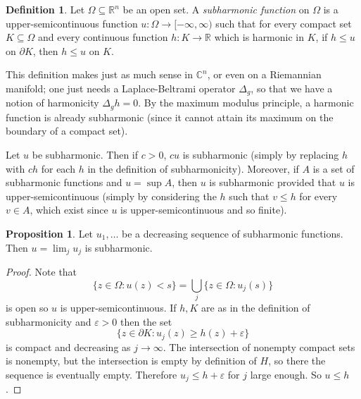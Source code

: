\documentclass[12pt]{report}
\newcommand{\RR}{\mathbb{R}}
\newcommand{\CC}{\mathbb{C}}
\newcommand{\dfn}[1]{\emph{#1}\index{#1}}
\theoremstyle{definition}
\newtheorem{proposition}[theorem]{Proposition}
\newtheorem{definition}[theorem]{Definition}
\begin{document}
\begin{definition}
    Let $\Omega \subseteq \RR^n$ be an open set. A \dfn{subharmonic function} on $\Omega$ is a upper-semicontinuous function $u: \Omega \to [-\infty, \infty)$ such that for every compact set $K \subseteq \Omega$ and every continuous function $h: K \to \RR$ which is harmonic in $K$, if $h \leq u$ on $\partial K$, then $h \leq u$ on $K$.
\end{definition}
This definition makes just as much sense in $\CC^n$, or even on a Riemannian manifold; one just needs a Laplace-Beltrami operator $\Delta_g$, so that we have a notion of harmonicity $\Delta_g h = 0$. By the maximum modulus principle, a harmonic function is already subharmonic (since it cannot attain its maximum on the boundary of a compact set).

Let $u$ be subharmonic. Then if $c > 0$, $cu$ is subharmonic (simply by replacing $h$ with $ch$ for each $h$ in the definition of subharmonicity). Moreover, if $A$ is a set of subharmonic functions and $u = \sup A$, then $u$ is subharmonic provided that $u$ is upper-semicontinuous (simply by considering the $h$ such that $v \leq h$ for every $v \in A$, which exist since $u$ is upper-semicontinuous and so finite).

\begin{proposition}
Let $u_1, \dots$ be a decreasing sequence of subharmonic functions. Then $u = \lim_j u_j$ is subharmonic.
\end{proposition}
\begin{proof}
    Note that
    $$\{z \in \Omega: u(z) < s\} = \bigcup_j \{z \in \Omega: u_j(s)\}$$
    is open so $u$ is upper-semicontinuous. If $h, K$ are as in the definition of subharmonicity and $\varepsilon > 0$ then the set
    $$\{z \in \partial K: u_j(z) \geq h(z) + \varepsilon\}$$
    is compact and decreasing as $j \to \infty$. The intersection of nonempty compact sets is nonempty, but the intersection is empty by definition of $H$, so there the sequence is eventually empty. Therefore $u_j \leq h + \varepsilon$ for $j$ large enough. So $u \leq h$.
\end{proof}
\end{document}
